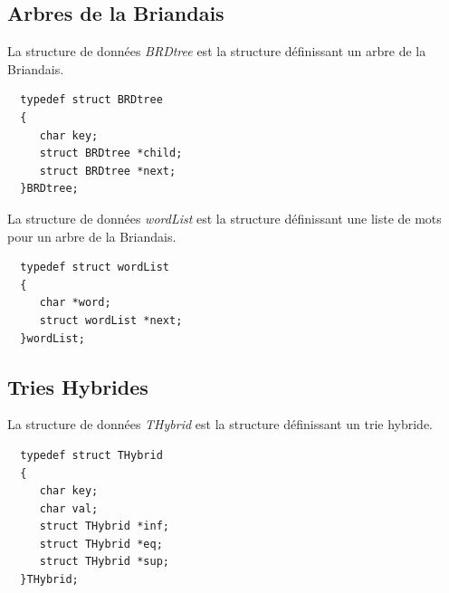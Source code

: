 \documentclass[a4paper,8pt]{report}
\begin{document}
\subsection*{Arbres de la Briandais}\label{sec:name}

La structure de donn\'ees \textit{BRDtree} est la structure d\'efinissant un arbre de la Briandais.
\begin{verbatim}
  typedef struct BRDtree
  {
     char key; 
     struct BRDtree *child; 
     struct BRDtree *next; 
  }BRDtree;
\end{verbatim}

La structure de donn\'ees \textit{wordList} est la structure d\'efinissant une liste de mots pour un arbre de la Briandais.
\begin{verbatim}
  typedef struct wordList
  {
     char *word;
     struct wordList *next;
  }wordList;
\end{verbatim}

\subsection*{Tries Hybrides}\label{sec:name}

La structure de donn\'ees \textit{THybrid} est la structure d\'efinissant un trie hybride.
\begin{verbatim}
  typedef struct THybrid
  {
     char key;
     char val;
     struct THybrid *inf;
     struct THybrid *eq;
     struct THybrid *sup;
  }THybrid;
\end{verbatim}

\listoffigures
\newpage
\end{document}

